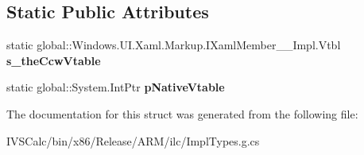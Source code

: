 \subsection*{Static Public Attributes}
\begin{DoxyCompactItemize}
\item 
\mbox{\label{struct_windows_1_1_u_i_1_1_xaml_1_1_markup_1_1_i_xaml_member_____impl_1_1_vtbl_a4c2174a161a4816ddf2b11af5c0f37a4}} 
static global\+::\+Windows.\+U\+I.\+Xaml.\+Markup.\+I\+Xaml\+Member\+\_\+\+\_\+\+Impl.\+Vtbl {\bfseries s\+\_\+the\+Ccw\+Vtable}
\item 
\mbox{\label{struct_windows_1_1_u_i_1_1_xaml_1_1_markup_1_1_i_xaml_member_____impl_1_1_vtbl_a29d4933dda43263c000b51b716ced3d3}} 
static global\+::\+System.\+Int\+Ptr {\bfseries p\+Native\+Vtable}
\end{DoxyCompactItemize}


The documentation for this struct was generated from the following file\+:\begin{DoxyCompactItemize}
\item 
I\+V\+S\+Calc/bin/x86/\+Release/\+A\+R\+M/ilc/Impl\+Types.\+g.\+cs\end{DoxyCompactItemize}
